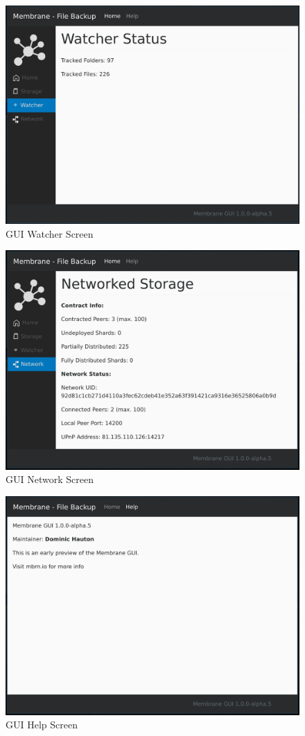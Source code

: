 \documentclass[11pt, a4paper, twoside]{report}
\begin{document}
\begin{figure}[!htb]
 \centering
 \includegraphics[width=\textwidth]{gui-watcher}
 \caption{GUI Watcher Screen}
 \label{fig:gui-watcher}
\end{figure}

\begin{figure}[!htb]
 \centering
 \includegraphics[width=\textwidth]{gui-network}
 \caption{GUI Network Screen}
 \label{fig:gui-network}
\end{figure}

\begin{figure}[!htb]
 \centering
 \includegraphics[width=\textwidth]{gui-help}
 \caption{GUI Help Screen}
 \label{fig:gui-help}
\end{figure}
\end{document}
